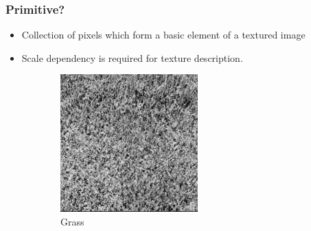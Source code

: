 \documentclass{beamer}
\begin{document}
\begin{frame}
\frametitle{Primitive?}
 

  \begin{itemize}
  \item Collection of pixels which form a basic element of a textured image
    \item Scale dependency is required for texture description.  
  \end{itemize}

\begin{figure}[h]
        \centering
        \begin{subfigure}[b]{0.4\textwidth}
          \includegraphics[width=\textwidth]{grass}
                \caption{Grass}
                \label{fig:ma}
        \end{subfigure}
        ~ %
        \begin{subfigure}[b]{0.4\textwidth}

\end{subfigure}
\end{figure}
\end{frame}
\end{document}
